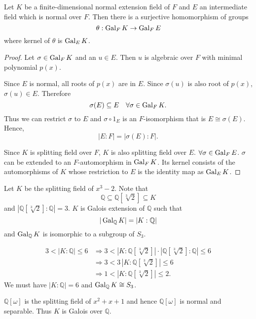 \begin{lemma}
    Let $K$ be a finite-dimensional normal extension field of $F$ and $E$ an intermediate field 
    which is normal over $F$. Then there is a surjective homomorphism of groups
    \[
        \theta : \operatorname{Gal}_F K \to \operatorname{Gal}_F E
    \]
    where kernel of $\theta$ is $\operatorname{Gal}_E K$.
\end{lemma}
\begin{proof}
    Let $\sigma \in \operatorname{Gal}_F K$ and an $u \in E$. Then $u$ is algebraic over $F$ with minimal polynomial 
    $p(x)$.

    Since $E$ is normal, all roots of $p(x)$ are in $E$. Since $\sigma(u)$ is also 
    root of $p(x)$, $\sigma(u) \in E$. Therefore
    \[
        \sigma(E) \subseteq E \quad \forall \sigma \in \operatorname{Gal}_F K.
    \]
    Thus we can restrict $\sigma$ to $E$ and $\sigma \circ 1_E$ is an $F$-isomorphism 
    that is $E \cong \sigma(E)$. Hence,
    \[
        |E:F| = |\sigma(E):F|.
    \]

    Since $K$ is splitting field over $F$, $K$ is also splitting field over $E$. $\forall \sigma \in \operatorname{Gal}_F E$. 
    $\sigma$ can be extended to an $F$-automorphism in $\operatorname{Gal}_F K$. Its kernel consists of the automorphisms of $K$
    whose restriction to $E$ is the identity map as $\operatorname{Gal}_E K$.
\end{proof}

\begin{example}
    Let $K$ be the splitting field of $x^3 - 2$. Note that 
    \[
        \mathbb{Q} \subseteq \mathbb{Q}[\sqrt[3]{2}] \subseteq K
    \]
    and $|\mathbb{Q}[\sqrt[3]{2}]: \mathbb{Q}| = 3$. $K$ is Galois extension of $\mathbb{Q}$ 
    such that 
    \[
    | \operatorname{Gal}_\mathbb{Q} K| = |K:\mathbb{Q}|
    \]
    and $\operatorname{Gal}_\mathbb{Q} K$ is isomorphic to a subgroup of $S_3$.

    \begin{align*}
        3 < |K:\mathbb{Q}| \leq 6 &\Longrightarrow 3 < |K: \mathbb{Q}[\sqrt[3]{2}]| \cdot |\mathbb{Q}[\sqrt[3]{2}] : \mathbb{Q}| \leq 6\\
        &\Longrightarrow 3 < 3\, |K: \mathbb{Q}[\sqrt[3]{2}] | \leq 6\\
        &\Longrightarrow 1 < |K: \mathbb{Q}[\sqrt[3]{2}] | \leq 2.
    \end{align*}
    We must have $|K: \mathbb{Q}| = 6$ and $\operatorname{Gal}_\mathbb{Q} K \cong S_3$.

    $\mathbb{Q}[\omega]$ is the splitting field of $x^2 + x + 1$ and hence $\mathbb{Q}[\omega]$ is 
    normal and separable. Thus $K$ is Galois over $\mathbb{Q}$.
\end{example}

